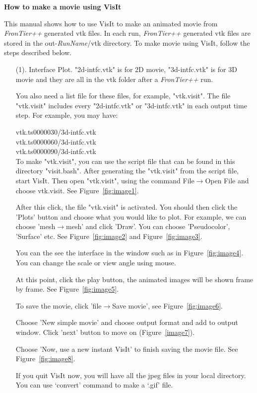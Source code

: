 \documentclass[12pt]{article}
\newcommand{\Fig}[1]{Figure~\ref{#1}}
\begin{document}
\centerline{\Large\bf How to make a movie using VisIt}
\vskip 1.5cm

This manual shows how to use VisIt to make an animated movie from 
{\it FronTier++} generated vtk files. In each run, {\it FronTier++} 
generated vtk files are stored in the
out-{\it RunName}/vtk directory. To make movie using VisIt, follow 
the steps described below.

\begin{itemize}
\item[(1).] Interface Plot.
"2d-intfc.vtk" is for 2D movie, "3d-intfc.vtk" is for 3D movie and 
they are all in the vtk folder after a {\it FronTier++} run.

You also need a list file for these files, for example, "vtk.visit".
The file "vtk.visit" includes every "2d-intfc.vtk" or "3d-intfc.vtk" 
in each output time step. For example, you may have: 

\noindent
vtk.ts0000030/3d-intfc.vtk \\
vtk.ts0000060/3d-intfc.vtk \\
vtk.ts0000090/3d-intfc.vtk \\

To make "vtk.visit", you can use the script file that can be found in this
directory "visit.bash". After generating the "vtk.visit" from the
script file, start VisIt. Then open "vtk.visit", using the command
File$\rightarrow$Open File and choose vtk.visit. See \Fig{fig:image1}.

After this click, the file "vtk.visit" is activated.
You should then click the 'Plots' button and choose what you would like to
plot. For example, we can choose 'mesh$\rightarrow$mesh' and click 'Draw'.
You can choose 'Pseudocolor', 'Surface' etc. See \Fig{fig:image2} and 
\Fig{fig:image3}.

You can the see the interface in the window such as in \Fig{fig:image4}.
You can change the scale or view angle using mouse.

At this point, click the play button, the animated images will be
shown frame by frame. See \Fig{fig:image5}.

To save the movie, click 'file$\rightarrow$Save movie', see 
\Fig{fig:image6}.

Choose 'New simple movie' and choose output format and add to output
window. Click 'next' button to move on (\Fig{image7}).

Choose 'Now, use a new instant VisIt’ to finish saving the movie file.
See \Fig{fig:image8}.

If you quit VisIt now, you will have all the jpeg files in
your local directory. You can use ‘convert’ command to make a ‘.gif’ file.


\end{itemize}
\end{document}
